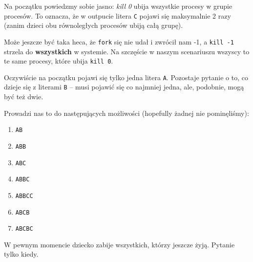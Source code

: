 Na początku powiedzmy sobie jasno: \textit{kill 0} ubija wszystkie procesy w grupie procesów. To oznacza, że w outpucie litera \texttt{C} pojawi się maksymalnie 2 razy (zanim dzieci obu równoległych procesów ubiją całą grupę).

Może jeszcze być taka heca, że \texttt{fork} się nie udał i zwrócił nam -1, a \texttt{kill -1} strzela do \textbf{wszystkich} w systemie. Na szczęście w naszym scenariuszu wszyscy to te same procesy, które ubija \texttt{kill 0}.

Oczywiście na początku pojawi się tylko jedna litera \texttt{A}. Pozostaje pytanie o to, co dzieje się z literami \texttt{B} -- musi pojawić się co najmniej jedna, ale, podobnie, mogą być też dwie.

Prowadzi nas to do następujących możliwości (hopefully żadnej nie pominęliśmy): \begin{enumerate}
    \item \texttt{AB}
    \item \texttt{ABB}
    \item \texttt{ABC}
    \item \texttt{ABBC}
    \item \texttt{ABBCC}
    \item \texttt{ABCB}
    \item \texttt{ABCBC}
    
\end{enumerate}

W pewnym momencie dziecko zabije wszystkich, którzy jeszcze żyją. Pytanie tylko kiedy.